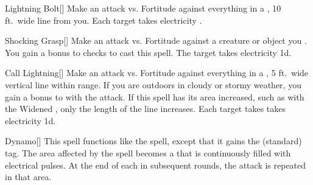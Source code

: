 \lowercase{\hypertarget{spell:Lightning Bolt}{}}\label{spell:Lightning Bolt}
\begin{freeability}[\nth{1}]{\hypertarget{spell:Lightning Bolt}{Lightning Bolt}}[]
Make an attack vs. Fortitude against everything in a \areamed, 10 ft.\ wide line from you.
\hit Each target takes electricity .
\end{freeability}
\vspace{0.25em}



\lowercase{\hypertarget{spell:Shocking Grasp}{}}\label{spell:Shocking Grasp}
\begin{freeability}[\nth{1}]{\hypertarget{spell:Shocking Grasp}{Shocking Grasp}}[]
Make an attack vs. Fortitude against a creature or object you .
You gain a  bonus to  checks to cast this spell.
\hit The target takes electricity  \plus1d.
\end{freeability}
\vspace{0.25em}



\lowercase{\hypertarget{spell:Call Lightning}{}}\label{spell:Call Lightning}
\begin{freeability}[\nth{2}]{\hypertarget{spell:Call Lightning}{Call Lightning}}[]
Make an attack vs. Fortitude against everything in a \arealarge, 5 ft.\ wide vertical line within \rngmed range.
If you are outdoors in cloudy or stormy weather, you gain a  bonus to  with the attack.
If this spell has its area increased, such as with the Widened , only the length of the line increases.
\hit Each target takes takes electricity  \plus1d.
\end{freeability}
\vspace{0.25em}



\lowercase{\hypertarget{spell:Dynamo}{}}\label{spell:Dynamo}
\begin{freeability}[\nth{2}]{\hypertarget{spell:Dynamo}{Dynamo}}[]
This spell functions like the  spell, except that it gains the  (standard) tag.
The area affected by the spell becomes a  that is continuously filled with electrical pulses.
At the end of each  in subsequent rounds, the attack is repeated in that area.
\end{freeability}
\vspace{0.25em}



